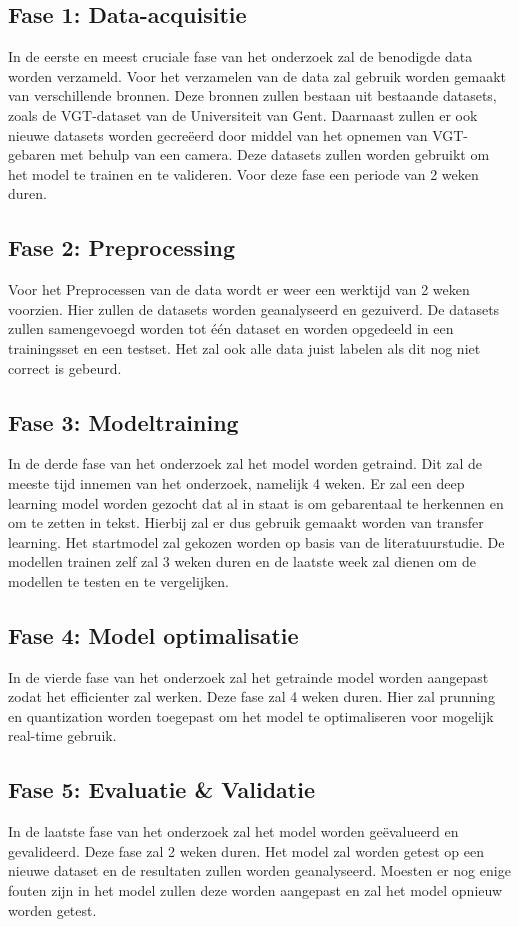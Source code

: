 \subsection{Fase 1: Data-acquisitie}
In de eerste en meest cruciale fase van het onderzoek zal de benodigde data worden verzameld.
Voor het verzamelen van de data zal gebruik worden gemaakt van verschillende bronnen.
Deze bronnen zullen bestaan uit bestaande datasets, zoals de VGT-dataset van de Universiteit van Gent.
Daarnaast zullen er ook nieuwe datasets worden gecreëerd door middel van het opnemen van VGT-gebaren met behulp van een camera.
Deze datasets zullen worden gebruikt om het model te trainen en te valideren.
Voor deze fase een periode van 2 weken duren.
\subsection{Fase 2: Preprocessing}
Voor het Preprocessen van de data wordt er weer een werktijd van 2 weken voorzien.
Hier zullen de datasets worden geanalyseerd en gezuiverd.
De datasets zullen samengevoegd worden tot één dataset en worden opgedeeld in een trainingsset en een testset.
Het zal ook alle data juist labelen als dit nog niet correct is gebeurd.
\subsection{Fase 3: Modeltraining}
In de derde fase van het onderzoek zal het model worden getraind.
Dit zal de meeste tijd innemen van het onderzoek, namelijk 4 weken.
Er zal een deep learning model worden gezocht dat al in staat is om gebarentaal te herkennen en om te zetten in tekst.
Hierbij zal er dus gebruik gemaakt worden van transfer learning.
Het startmodel zal gekozen worden op basis van de literatuurstudie.
De modellen trainen zelf zal 3 weken duren en de laatste week zal dienen om de modellen te testen en te vergelijken.
\subsection{Fase 4: Model optimalisatie}
In de vierde fase van het onderzoek zal het getrainde model worden aangepast zodat het efficienter zal werken.
Deze fase zal 4 weken duren.
Hier zal prunning en quantization worden toegepast om het model te optimaliseren voor mogelijk real-time gebruik.
\subsection{Fase 5: Evaluatie \& Validatie}
In de laatste fase van het onderzoek zal het model worden geëvalueerd en gevalideerd.
Deze fase zal 2 weken duren.
Het model zal worden getest op een nieuwe dataset en de resultaten zullen worden geanalyseerd.
Moesten er nog enige fouten zijn in het model zullen deze worden aangepast en zal het model opnieuw worden getest.

